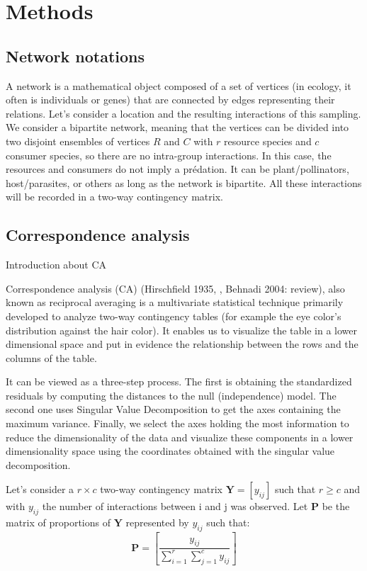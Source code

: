 \section{Methods}

\subsection{Network notations}
A network is a mathematical object composed of  a set of vertices (in ecology, it often is individuals or genes) that are connected by edges representing their relations.
Let's consider a location and the resulting interactions of this sampling. We consider a bipartite network, meaning that the vertices can be divided into two disjoint ensembles of vertices $R$ and $C$ with $r$ resource species and $c$ consumer species, so there are no intra-group interactions. In this case, the resources and consumers do not imply a prédation. It can be plant/pollinators, host/parasites, or others as long as the network is bipartite.  All these interactions will be recorded in a two-way contingency matrix.


\citet{vadigepalli2003paint}


\subsection{Correspondence analysis}

Introduction about CA

Correspondence analysis (CA) (Hirschfield 1935, \citet{hill_correspondence_1974}, Behnadi 2004: review), also known as reciprocal averaging is a multivariate statistical technique primarily developed to analyze two-way contingency tables (for example the eye color's distribution against the hair color). It enables us to visualize the table in a lower dimensional space and put in evidence the relationship between the rows and the columns of the table.

It can be viewed as a three-step process. The first is obtaining the standardized residuals by computing the distances to the null (independence) model. The second one uses Singular Value Decomposition to get the axes containing the maximum variance. Finally, we select the axes holding the most information to reduce the dimensionality of the data and visualize these components in a lower dimensionality space using the coordinates obtained with the singular value decomposition.


Let's consider a $r \times c$ two-way contingency matrix $\mathbf{Y} = [y_{ij}]$ such that $r\geq c$ and with $y_{ij}$ the number of interactions between i and j was observed. Let $\mathbf{P}$ be the matrix of proportions of $\mathbf{Y}$ represented by $y_{ij}$ such that:
$$
\mathbf{P} = \left[ \frac{y_{ij}}{\sum_{i=1}^{r} \sum_{j=1}^{c} y_{ij}} \right]
$$

